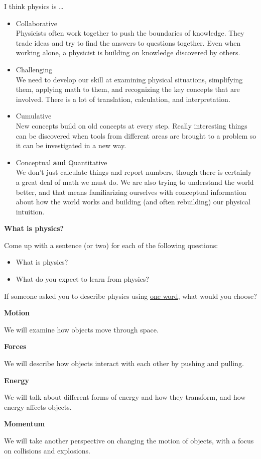 \documentclass[]{article}
\begin{document}
\newpage
\begin{TeacherMargin}
\noindent I think physics is \dots
\begin{itemize}
	\item Collaborative \\ Physicists often work together to push the boundaries of knowledge. They trade ideas and try to find the answers to questions together. Even when working alone, a physicist is building on knowledge discovered by others.
	\item Challenging \\ We need to develop our skill at examining physical situations, simplifying them, applying math to them, and recognizing the key concepts that are involved. There is a lot of translation, calculation, and interpretation.
	\item Cumulative \\ New concepts build on old concepts at every step. Really interesting things can be discovered when tools from different areas are brought to a problem so it can be investigated in a new way.
	\item Conceptual \textbf{and} Quantitative \\ We don't just calculate things and report numbers, though there is certainly a great deal of math we must do. We are also trying to understand the world better, and that means familiarizing ourselves with conceptual information about how the world works and building (and often rebuilding) our physical intuition.
\end{itemize}
\end{TeacherMargin}
\begin{PresentSpace}
\begin{center}
	\textbf{What is physics?}
\end{center}
Come up with a sentence (or two) for each of the following questions:
\begin{itemize}
	\item What is physics?
	\item What do you expect to learn from physics?
\end{itemize}
If someone asked you to describe physics using \underline{one word}, what would you choose?
\end{PresentSpace}
\newpage
\begin{TeacherMargin}
\noindent\textbf{Motion}

We will examine how objects move through space.

\noindent\textbf{Forces}

We will describe how objects interact with each other by pushing and pulling.

\noindent\textbf{Energy}

We will talk about different forms of energy and how they transform, and how energy affects objects.

\noindent\textbf{Momentum}

We will take another perspective on changing the motion of objects, with a focus on collisions and explosions.

\end{TeacherMargin}
\end{document}
